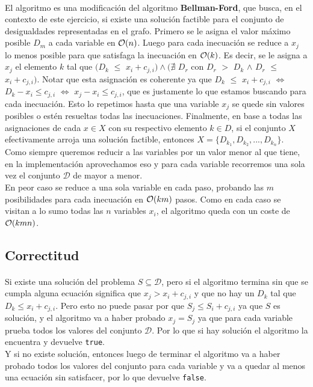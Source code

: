 \documentclass[../main.tex]{subfiles}
\begin{document}
\paragraph{} El algoritmo es una modificación del algoritmo \textbf{Bellman-Ford}, que busca, en el contexto de este ejercicio, si existe una soluci\'on factible para el conjunto de desigualdades representadas en el grafo. Primero se le asigna el valor máximo posible \(D_{m}\) a cada variable en \(\mathcal{O}(n)\). Luego para cada inecuación se reduce a \(x_{j}\) lo menos posible para que satisfaga la inecuación en \(\mathcal{O}(k)\). Es decir, se le asigna a $x_j$ el elemento $k$ tal que $(D_k$ $\leq$ $x_i + c_{j,i}) \land (\nexists$ $D_r$ con $D_r$ $>$ $D_k$ $\land$ $D_r$ $\leq$ $x_i + c_{j,i})$. Notar que esta asignaci\'on es coherente ya que $D_k$ $\leq$ $x_i + c_{j,i}$ $\iff$ $D_k - x_i \leq c_{j,i}$ $\iff$ $x_j - x_i \leq c_{j,i}$, que es justamente lo que estamos buscando para cada inecuaci\'on. Esto lo repetimos hasta que una variable \(x_{j}\) se quede sin valores posibles o estén resueltas todas las inecuaciones. Finalmente, en base a todas las asignaciones de cada $x \in X$ con su respectivo elemento $k \in D$, si el conjunto $X$ efectivamente arroja una soluci\'on factible, entonces $X = \lbrace D_{k_1}, D_{k_2}, ..., D_{k_n} \rbrace$. \\
Como siempre queremos reducir a las variables por un valor menor al que tiene, en la implementación aprovechamos eso y para cada variable recorremos una sola vez el conjunto \(\mathcal{D}\) de mayor a menor. \\
En peor caso se reduce a una sola variable en cada paso, probando las \(m\) posibilidades para cada inecuación en \(\mathcal{O}(km)\) pasos. Como en cada caso se visitan a lo sumo todas las $n$ variables $x_i$, el algoritmo queda con un coste de \(\mathcal{O}(kmn)\). \\

\subsection{Correctitud}
\label{sec:ej4-proof}

\paragraph{} Si existe una solución del problema \(S \subseteq \mathcal{D}\), pero si el algoritmo termina sin que se cumpla alguna ecuación significa que \(x_{j} > x_{i} + c_{j,i}\) y que no hay un \(D_{k}\) tal que \(D_k \leq x_{i} + c_{j,i}\). Pero esto no puede pasar por que \(S_{j} \leq S_{i} + c_{j,i}\) ya que \(S\) es solución, y el algoritmo va a haber probado \(x_{j} = S_{j}\) ya que para cada variable prueba todos los valores del conjunto \(\mathcal{D}\). Por lo que si hay solución el algoritmo la encuentra y devuelve \texttt{true}. \\
Y si no existe solución, entonces luego de terminar el algoritmo va a haber probado todos los valores del conjunto para cada variable y va a quedar al menos una ecuación sin satisfacer, por lo que devuelve \texttt{false}.
\end{document}
